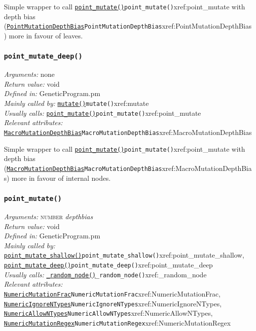 \documentclass[a4paper]{article}
\begin{document}
Simple wrapper to call \hyperref[no]{\texttt{point\_mutate()}}{\texttt{point\_mutate()}}{xref:point_mutate} with depth bias
(\hyperref[no]{\texttt{PointMutationDepthBias}}{\texttt{PointMutationDepthBias}}{xref:PointMutationDepthBias}) more in favour of leaves.

\subsubsection{\texttt{point\_mutate\_deep()}}\label{xref:point_mutate_deep}
\begin{flushleft}
\textit{Arguments:} none\\
\textit{Return value:} void\\
\textit{Defined in:} GeneticProgram.pm\\
\textit{Mainly called by:} \hyperref[no]{\texttt{mutate()}}{\texttt{mutate()}}{xref:mutate}\\
\textit{Usually calls:} \hyperref[no]{\texttt{point\_mutate()}}{\texttt{point\_mutate()}}{xref:point_mutate}\\
\textit{Relevant attributes:} \hyperref[no]{\texttt{MacroMutationDepthBias}}{\texttt{MacroMutationDepthBias}}{xref:MacroMutationDepthBias}
\end{flushleft}

Simple wrapper to call \hyperref[no]{\texttt{point\_mutate()}}{\texttt{point\_mutate()}}{xref:point_mutate} with depth bias
(\hyperref[no]{\texttt{MacroMutationDepthBias}}{\texttt{MacroMutationDepthBias}}{xref:MacroMutationDepthBias}) more in favour of internal nodes.


\subsubsection{\texttt{point\_mutate()}}\label{xref:point_mutate}
\begin{flushleft}
\textit{Arguments:} \textsc{number} \textit{depthbias}\\
\textit{Return value:} void\\
\textit{Defined in:} GeneticProgram.pm\\
\textit{Mainly called by:} \hyperref[no]{\texttt{point\_mutate\_shallow()}}{\texttt{point\_mutate\_shallow()}}{xref:point_mutate_shallow}, \hyperref[no]{\texttt{point\_mutate\_deep()}}{\texttt{point\_mutate\_deep()}}{xref:point_mutate_deep}\\
\textit{Usually calls:} \hyperref[no]{\texttt{\_random\_node()}}{\texttt{\_random\_node()}}{xref:_random_node}\\
\textit{Relevant attributes:} \hyperref[no]{\texttt{NumericMutationFrac}}{\texttt{NumericMutationFrac}}{xref:NumericMutationFrac}, \hyperref[no]{\texttt{NumericIgnoreNTypes}}{\texttt{NumericIgnoreNTypes}}{xref:NumericIgnoreNTypes}, \hyperref[no]{\texttt{NumericAllowNTypes}}{\texttt{NumericAllowNTypes}}{xref:NumericAllowNTypes}, \hyperref[no]{\texttt{NumericMutationRegex}}{\texttt{NumericMutationRegex}}{xref:NumericMutationRegex}
\end{flushleft}
\end{document}
